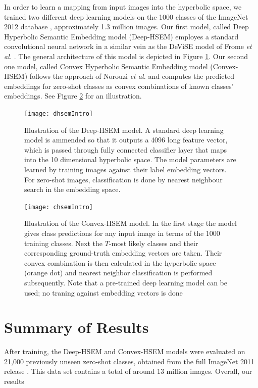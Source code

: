 \documentclass[12pt]{report}
\begin{document}
In order to learn a mapping from input images into the hyperbolic space, we trained two different deep learning models on the 1000 classes of the ImageNet 2012 database \cite{JiaDeng2009}, approximately 1.3 million images. Our first model, called Deep Hyperbolic Semantic Embedding model (Deep-HSEM) employes a standard convolutional neural network in a similar vein as the DeViSE model of Frome \textit{et al.} \cite{Frome2013}. The general architecture of this model is depicted in Figure \ref{fig:dhsemIntro}. Our second one model, called Convex Hyperbolic Semantic Embedding model (Convex-HSEM) follows the approach of Norouzi \textit{et al.} \cite{Norouzi2013} and computes the predicted embeddings for zero-shot classes as convex combinations of known classes' embeddings. See Figure \ref{fig:chsemIntro} for an illustration.

\begin{figure}
  \centering
	\texttt{[image: dhsemIntro]}
	\caption{Illustration of the Deep-HSEM model. A standard deep learning model is ammended so that it outputs a 4096 long feature vector, which is passed through fully connected classifier layer that maps into the 10 dimensional hyperbolic space. The model parameters are learned by training images against their label embedding vectors. For zero-shot images, classification is done by nearest neighbour search in the embedding space.}
	\label{fig:dhsemIntro}
\end{figure}

\begin{figure}
  \centering
	\texttt{[image: chsemIntro]}
	\caption{Illustration of the Convex-HSEM model. In the first stage the model gives class predictions for any input image in terms of the 1000 training classes. Next the $T$-most likely classes and their corresponding ground-truth embedding vectors are taken. Their convex combination is then calculated in the hyperbolic space (orange dot) and nearest neighbor classification is performed subsequently. Note that a pre-trained deep learning model can be used; no traning against embedding vectors is done}
	\label{fig:chsemIntro}
\end{figure}

\section{Summary of Results}

After training, the Deep-HSEM and Convex-HSEM models were evaluated on 21,000 previously unseen zero-shot classes, obtained from the full ImageNet 2011 release \cite{JiaDeng2009}. This data set contains a total of around 13 million images. Overall, our results
\end{document}
